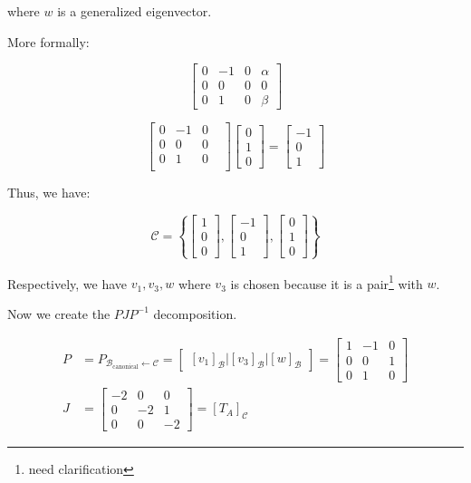 \begin{sol}
	where $w$ is a generalized eigenvector.

	More formally:

	\[\left[\begin{array}{ccc|c}
		0&-1&0&\alpha\\
		0&0&0&0\\
		0&1&0&\beta
	\end{array}\right]\]

	\[\begin{bmatrix}
		0&-1&0&\\
		0&0&0\\
		0&1&0\\
	\end{bmatrix}\begin{bmatrix}
		0\\1\\0
	\end{bmatrix} = \begin{bmatrix}
		-1\\0\\1
	\end{bmatrix}\]

	Thus, we have:

	\[\mathcal{C} = \left\{
	\begin{bmatrix}
		1\\0\\0
	\end{bmatrix}, \begin{bmatrix}
		-1\\0\\1
	\end{bmatrix}, \begin{bmatrix}
		0\\1\\0
	\end{bmatrix}
	\right\}\]

	Respectively, we have $v_1, v_3, w$ where $v_3$ is chosen because it is a pair\footnote{need clarification} with $w$.
	
	Now we create the $PJP^{-1}$ decomposition.

	\begin{align*}
		P &= P_{\mathcal{B_{\mathrm{canonical}} \leftarrow \mathcal{C}}} = \begin{bmatrix}
			[v_1]_\mathcal{B} \vert [v_3]_\mathcal{B} \vert [w]_\mathcal{B}
		\end{bmatrix} = \begin{bmatrix}
			1&-1&0\\0&0&1\\0&1&0
		\end{bmatrix}\\
		J &= \left[\begin{array}{c|cc}
			-2&0&0\\\hline 0&-2&1\\0&0&-2
		\end{array}\right] = [T_A]_\mathcal{C}
	\end{align*}
\end{sol}

